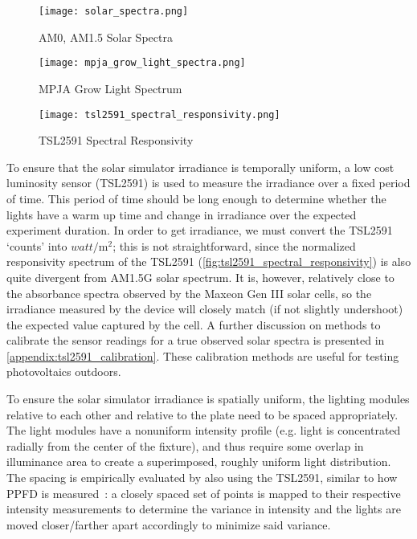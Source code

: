 \begin{figure}[!htbp]
    \centering
    \texttt{[image: solar\_spectra.png]}
    \caption{AM0, AM1.5 Solar Spectra}
    \label{fig:solar_spectra}
\end{figure}

\begin{figure}[!htbp]
    \centering
    \texttt{[image: mpja\_grow\_light\_spectra.png]}
    \caption{MPJA Grow Light Spectrum}
    \label{fig:grow_light_spectra}
\end{figure}

\begin{figure}[!htbp]
    \centering
    \texttt{[image: tsl2591\_spectral\_responsivity.png]}
    \caption{TSL2591 Spectral Responsivity}
    \label{fig:tsl2591_spectral_responsivity}
\end{figure}

To ensure that the solar simulator irradiance is temporally uniform, a low
cost luminosity sensor (TSL2591) is used to measure the irradiance over a fixed
period of time. This period of time should be long enough to determine whether
the lights have a warm up time and change in irradiance over the expected
experiment duration. In order to get irradiance, we must convert the TSL2591
`counts' into $\si{watt}/\si{\meter}^2$; this is not straightforward, since
the normalized responsivity spectrum of the TSL2591
(\autoref{fig:tsl2591_spectral_responsivity}) is also quite divergent from
AM1.5G solar spectrum. It is, however, relatively close to the absorbance
spectra observed by the Maxeon Gen III solar cells, so the irradiance measured
by the device will closely match (if not slightly undershoot) the expected value
captured by the cell. A further discussion on methods to calibrate the sensor
readings for a true observed solar spectra is presented in
\autoref{appendix:tsl2591_calibration}. These calibration methods are useful for
testing photovoltaics outdoors.

To ensure the solar simulator irradiance is spatially uniform, the lighting
modules relative to each other and relative to the plate need to be spaced
appropriately. The light modules have a nonuniform intensity profile (e.g. light
is concentrated radially from the center of the fixture), and thus require some
overlap in illuminance area to create a superimposed, roughly uniform light
distribution. The spacing is empirically evaluated by also using the TSL2591,
similar to how \acf{PPFD} is measured~\cite{ppfd_measurement}: a closely spaced
set of points is mapped to their respective intensity measurements to
determine the variance in intensity and the lights are moved closer/farther
apart accordingly to minimize said variance.

